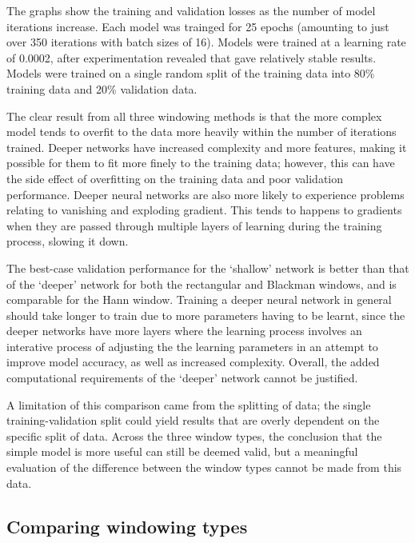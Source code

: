 \documentclass[class=report,11pt,crop=false]{standalone}
\begin{document}
The graphs show the training and validation losses as the number of model iterations increase. Each model was trainged for 25 epochs (amounting to just over 350 iterations with batch sizes of 16). Models were trained at a learning rate of 0.0002, after experimentation revealed that gave relatively stable results. Models were trained on a single random split of the training data into 80\% training data and 20\% validation data.

The clear result from all three windowing methods is that the more complex model tends to overfit to the data more heavily within the number of iterations trained. Deeper networks have increased complexity and more features, making it possible for them to fit more finely to the training data; however, this can have the side effect of overfitting on the training data and poor validation performance. Deeper neural networks are also more likely to experience problems relating to vanishing and exploding gradient. This tends to happens to gradients when they are passed through multiple layers of learning during the training process, slowing it down.

The best-case validation performance for the `shallow' network is better than that of the `deeper' network for both the rectangular and Blackman windows, and is comparable for the Hann window. Training a deeper neural network in general should take longer to train due to more parameters having to be learnt, since the deeper networks have more layers where the learning process involves an interative process of adjusting the the learning parameters in an attempt to improve model accuracy, as well as increased complexity. Overall, the added computational requirements of the `deeper' network cannot be justified.

A limitation of this comparison came from the splitting of data; the single training-validation split could yield results that are overly dependent on the specific split of data. Across the three window types, the conclusion that the simple model is more useful can still be deemed valid, but a meaningful evaluation of the difference between the window types cannot be made from this data.



\subsection{Comparing windowing types} \label{ss:windowtypes}
\end{document}
